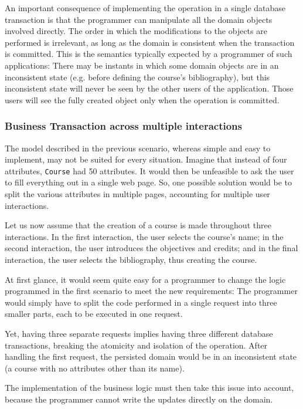 \documentclass{llncs}
\begin{document}
An important consequence of implementing the operation in a single
database transaction is that the programmer can manipulate all the
domain objects involved directly. The order in which the modifications
to the objects are performed is irrelevant, as long as the domain is
consistent when the transaction is committed. This is the semantics
typically expected by a programmer of such applications: There may be
instants in which some domain objects are in an inconsistent state
(e.g. before defining the course's bibliography), but this
inconsistent state will never be seen by the other users of the
application. Those users will see the fully created object only when
the operation is committed.

\subsubsection{Business Transaction across multiple interactions}

The model described in the previous scenario, whereas simple and easy
to implement, may not be suited for every situation. Imagine that
instead of four attributes, \texttt{Course} had 50 attributes. It
would then be unfeasible to ask the user to fill everything out in a
single web page. So, one possible solution would be to split the
various attributes in multiple pages, accounting for multiple user
interactions.

Let us now assume that the creation of a course is made throughout
three interactions. In the first interaction, the user selects the
course's name; in the second interaction, the user introduces the
objectives and credits; and in the final interaction, the user selects
the bibliography, thus creating the course.

At first glance, it would seem quite easy for a programmer to change
the logic programmed in the first scenario to meet the new
requirements: The programmer would simply have to split the code
performed in a single request into three smaller parts, each to be
executed in one request.

Yet, having three separate requests implies having three different
database transactions, breaking the atomicity and isolation of the
operation. After handling the first request, the persisted domain
would be in an inconsistent state (a course with no attributes other
than its name).

The implementation of the business logic must then take this issue
into account, because the programmer cannot write the updates directly
on the domain.
\end{document}
